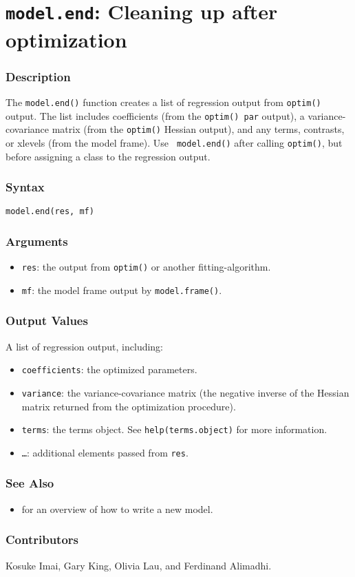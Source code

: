 \section{{\tt model.end}: Cleaning up after optimization}
\label{model.end}

\subsubsection{Description}

The {\tt model.end()} function creates a list of regression output from
{\tt optim()} output.  The list includes coefficients (from the {\tt optim() 
par} output), a variance-covariance matrix (from the {\tt optim()} Hessian output), 
and any terms, contrasts, or xlevels (from the model frame).  Use  {\tt 
model.end()} after calling {\tt optim()}, but before assigning a class to the 
regression output.  

\subsubsection{Syntax}
\begin{verbatim}
model.end(res, mf)
\end{verbatim}

\subsubsection{Arguments}

\begin{itemize}
\item {\tt res}: the output from {\tt optim()} or another fitting-algorithm.  
\item {\tt mf}: the model frame output by {\tt model.frame()}.  
\end{itemize}

\subsubsection{Output Values}
A list of regression output, including:
\begin{itemize}
\item {\tt coefficients}: the optimized parameters.
\item {\tt variance}: the variance-covariance matrix (the negative
  inverse of the Hessian matrix returned from the optimization
  procedure).  
\item {\tt terms}:  the terms object.  See {\tt help(terms.object)}
  for more information.
\item {\tt \dots}: additional elements passed from {\tt res}.
\end{itemize}

\subsubsection{See Also}
\begin{itemize}
\item {} for an overview of how to write a new model.
\end{itemize}

\subsubsection{Contributors}

Kosuke Imai, Gary King, Olivia Lau, and Ferdinand Alimadhi.


